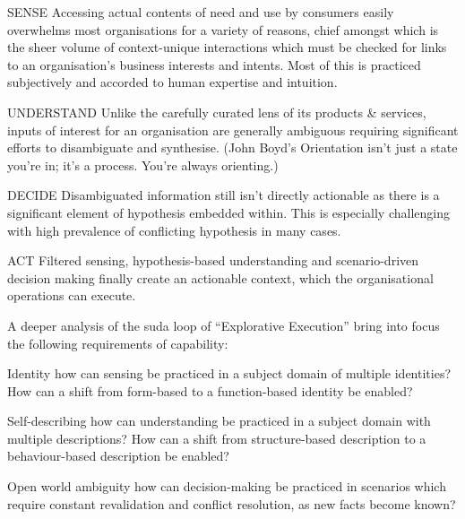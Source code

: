 \begin{basedescript}{%
    \desclabelstyle{\multilinelabel}
    \desclabelwidth{3cm}
}
    \item[SENSE] Accessing actual contents of need and use by consumers easily overwhelms most organisations
    for a variety of reasons, chief amongst which is the sheer volume of context-unique interactions which
    must be checked for links to an organisation’s business interests and intents.
    Most of this is practiced subjectively and accorded to human expertise and intuition.
    \item[UNDERSTAND] Unlike the carefully curated lens of its products \& services,
    inputs of interest for an organisation are generally ambiguous requiring significant efforts to
    disambiguate and synthesise.
    (John Boyd’s Orientation isn’t just a state you’re in; it’s a process. You’re always orienting.)
    \item[DECIDE] Disambiguated information still isn’t directly actionable as there is a significant element of
    hypothesis embedded within.
    This is especially challenging with high prevalence of conflicting hypothesis in many cases.
    \item[ACT] Filtered sensing, hypothesis-based understanding and scenario-driven decision making finally
    create an actionable context, which the organisational operations can execute.
\end{basedescript}

A deeper analysis of the \gls{suda} loop of “Explorative Execution” bring into focus the following requirements of capability:

\begin{basedescript}{%
    \desclabelstyle{\multilinelabel}
    \desclabelwidth{3cm}
}
    \item[Identity] how can sensing be practiced in a subject domain of multiple identities?
    How can a shift from form-based to a function-based identity be enabled?
    \item[Self-describing] how can understanding be practiced in a subject domain with multiple descriptions?
    How can a shift from structure-based description to a behaviour-based description be enabled?
    \item[Open world ambiguity] how can decision-making be practiced in scenarios which require constant
    revalidation and conflict resolution, as new facts become known?
\end{basedescript}

